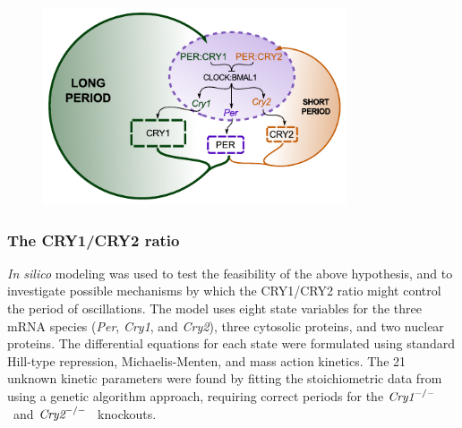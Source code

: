 \begin{figure}[bt]
  \centering
  \includegraphics[width=0.8\textwidth]{chap2/figures/twoloops_noopacity.pdf}
   \label{fig:twoloops}
\end{figure}

\subsubsection{The CRY1/CRY2 ratio}
{\it In silico} modeling was used to test the feasibility of the above hypothesis, and to investigate possible mechanisms by which the CRY1/CRY2 ratio might control the period of oscillations. 
The model uses eight state variables for the three mRNA species ({\it Per}, {\it Cry1}, and {\it Cry2}), three cytosolic proteins, and two nuclear proteins. 
The differential equations for each state were formulated using standard Hill-type repression, Michaelis-Menten, and mass action kinetics. 
The 21 unknown kinetic parameters were found by fitting the stoichiometric data from \cite{Lee2001} using a genetic algorithm approach, requiring correct periods for the $\text{\it Cry1}^{-/-}$  and $\text{\it Cry2}^{-/-}$  knockouts.

